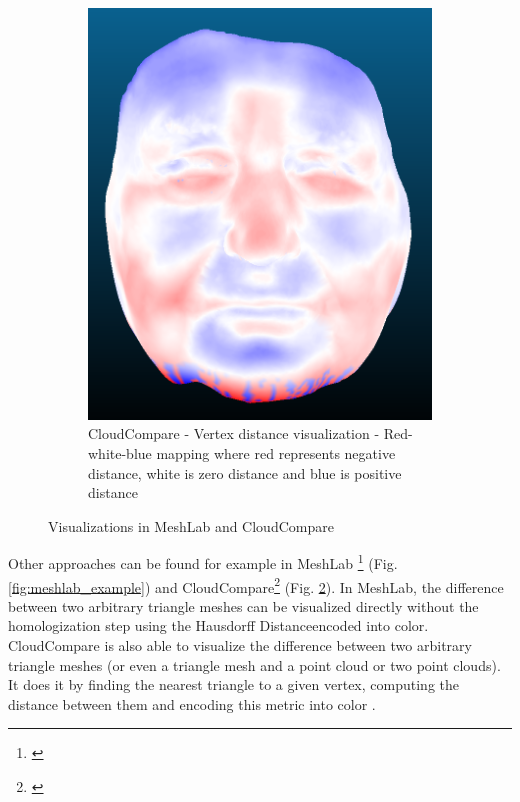 \begin{figure}[h]
\begin{subfigure}{0.3\textwidth}
	\includegraphics[width=\textwidth]{./img/cloudcompare-example01.PNG}
    \caption{CloudCompare - Vertex distance visualization - Red-white-blue mapping where red represents negative distance, white is zero distance and blue is positive distance}
    \label{fig:cloudcompare_example}
	\end{subfigure}
\caption{Visualizations in MeshLab and CloudCompare}
\end{figure}

Other approaches can be found for example in MeshLab \footnote{\citet{MeshLab}} (Fig. \ref{fig:meshlab_example}) and CloudCompare\footnote{\citet{CloudCmp}} (Fig. \ref{fig:cloudcompare_example}). In MeshLab, the difference between two arbitrary triangle meshes can be visualized directly without the homologization step using the Hausdorff Distance\footnotemark encoded into color. CloudCompare is also able to visualize the difference between two arbitrary triangle meshes (or even a triangle mesh and a point cloud or two point clouds). It does it by finding the nearest triangle to a given vertex, computing the distance between them and encoding this metric into color \citep{CloudCmpDistance}.

